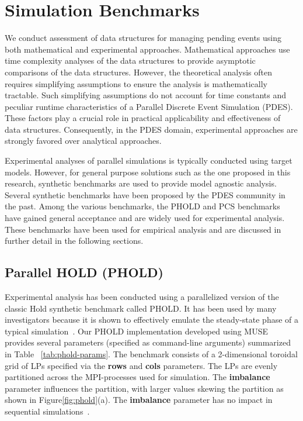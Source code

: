 \chapter{Simulation Benchmarks}  \label{sec:models}

We conduct assessment of data structures for managing pending events using both mathematical and experimental approaches.  Mathematical
approaches use time complexity analyses of the data structures to
provide asymptotic comparisons of the data structures. However, the
theoretical analysis often requires simplifying assumptions to ensure
the analysis is mathematically tractable. Such simplifying assumptions
do not account for time constants and peculiar runtime characteristics
of a Parallel Discrete Event Simulation (PDES).  These factors play a
crucial role in practical applicability and effectiveness of data
structures. Consequently, in the PDES domain, experimental approaches are
strongly favored over analytical approaches.

Experimental analyses of parallel simulations is typically conducted
using target models. However, for general purpose solutions such as the
one proposed in this research, synthetic benchmarks are used to
provide model agnostic analysis. Several synthetic benchmarks have
been proposed by the PDES community in the past.  Among the various
benchmarks, the PHOLD and PCS benchmarks have gained general
acceptance and are widely used for experimental analysis\cite{wilsey2016some}. These
benchmarks have been used for empirical analysis and are discussed in
further detail in the following sections.

\section{Parallel HOLD (PHOLD)} \label{sec:pholdModel}
Experimental analysis has been conducted using a parallelized version of the classic Hold synthetic benchmark called PHOLD. It has been used by many investigators because it is shown to effectively emulate the steady-state phase of a typical simulation~\cite{franceschini-15,tang-05}. Our PHOLD
implementation developed using MUSE provides several parameters
(specified as command-line arguments) summarized in Table ~\ref{tab:phold-params}. The benchmark consists of a 2-dimensional toroidal grid of LPs specified via the \textbf{rows} and \textbf{cols} parameters. The LPs are evenly partitioned across the MPI-processes used for simulation. The \textbf{imbalance} parameter influences the partition, with larger values skewing the partition as shown in Figure\ref{fig:phold}(a). The \textbf{imbalance} parameter has no impact in sequential simulations~\cite{higiro2017multi}.


